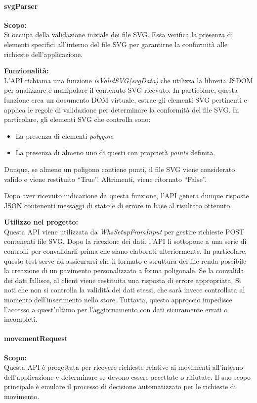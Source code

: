 \paragraph{svgParser}
\textbf{Scopo:}\\
Si occupa della validazione iniziale dei file SVG. Essa verifica la presenza di elementi specifici all'interno del file SVG per garantirne la conformità alle richieste dell'applicazione.

\bigskip
\noindent \textbf{Funzionalità:}\\
L'API richiama una funzione \textit{isValidSVG(svgData)} che utilizza la libreria JSDOM per analizzare e manipolare il contenuto SVG ricevuto. In particolare, questa funzione crea un documento DOM virtuale, estrae gli elementi SVG pertinenti e applica le regole di validazione per determinare la conformità del file SVG. In particolare, gli elementi SVG che controlla sono:
\begin{itemize}
    \item La presenza di elementi \textit{polygon};
    \item La presenza di almeno uno di questi con proprietà \textit{points} definita.
\end{itemize}
Dunque, se almeno un poligono contiene punti, il file SVG viene considerato valido e viene restituito ``True''. Altrimenti, viene ritornato ``False''.

\noindent Dopo aver ricevuto indicazione da questa funzione, l'API genera dunque risposte JSON contenenti messaggi di stato e di errore in base al risultato ottenuto.

\bigskip
\noindent \textbf{Utilizzo nel progetto:}\\
Questa API viene utilizzata da \textit{WhsSetupFromInput} per gestire richieste POST contenenti file SVG. Dopo la ricezione dei dati, l'API li sottopone a una serie di controlli per convalidarli prima che siano elaborati ulteriormente. In particolare, questo test serve ad assicurarsi che il formato e struttura del file renda possibile la creazione di un pavimento personalizzato a forma poligonale. Se la convalida dei dati fallisce, al client viene restituita una risposta di errore appropriata. Si noti che non si controlla la validità dei dati stessi, che sarà invece controllata al momento dell'inserimento nello store. Tuttavia, questo approccio impedisce l'accesso a quest'ultimo per l'aggiornamento con dati sicuramente errati o incompleti.

\paragraph{movementRequest}
\textbf{Scopo:}\\
Questa API è progettata per ricevere richieste relative ai movimenti all'interno dell'applicazione e determinare se devono essere accettate o rifiutate. Il suo scopo principale è emulare il processo di decisione automatizzato per le richieste di movimento.

